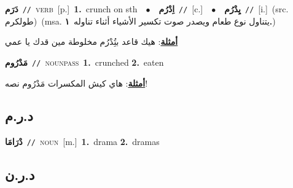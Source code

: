 \documentclass[10pt,a4paper,twoside]{article} %
\begin{document}
\begin{multicols}{2}
{\setlength\topsep{0pt}\textbf{\foreignlanguage{arabic}{دَرَم}}\ {\color{gray}\texttt{//}\color{black}}\ \textsc{verb}\ [p.]\ \textbf{1.}~crunch on sth\ \ $\bullet$\ \ \setlength\topsep{0pt}\textbf{\foreignlanguage{arabic}{اِدْرُم}}\ {\color{gray}\texttt{//}\color{black}}\ [c.]\ \ $\bullet$\ \ \setlength\topsep{0pt}\textbf{\foreignlanguage{arabic}{يِدْرُم}}\ {\color{gray}\texttt{//}\color{black}}\ [i.]\ (src. \color{gray}\foreignlanguage{arabic}{طولكرم}\color{black})\ \color{gray}(msa. \foreignlanguage{arabic}{يتناول نوع طعام ويصدر صوت تكسير الأشياء أثناء تناوله}~\foreignlanguage{arabic}{\textbf{١.}})\color{black}\  \begin{flushright}\color{gray}\foreignlanguage{arabic}{\textbf{\underline{\foreignlanguage{arabic}{أمثلة}}}: هيك قاعد بتُِدْرُم مخلوطة مين قدك يا عمي}\end{flushright}\color{black}} \vspace{2mm}

{\setlength\topsep{0pt}\textbf{\foreignlanguage{arabic}{مَدْرُوم}}\ {\color{gray}\texttt{//}\color{black}}\ \textsc{noun\textunderscore pass}\ \textbf{1.}~crunched  \textbf{2.}~eaten\  \begin{flushright}\color{gray}\foreignlanguage{arabic}{\textbf{\underline{\foreignlanguage{arabic}{أمثلة}}}: هاي كيش المكسرات مَدْرُوم نصه!}\end{flushright}\color{black}} \vspace{2mm}

\vspace{-3mm}
\subsection*{\color{blue}\foreignlanguage{arabic}{د.ر.م}\color{blue}{ (ntws)}} 

{\setlength\topsep{0pt}\textbf{\foreignlanguage{arabic}{دْرَامَا}}\ {\color{gray}\texttt{//}\color{black}}\ \textsc{noun}\ [m.]\ \textbf{1.}~drama  \textbf{2.}~dramas\ } \vspace{2mm}

\vspace{-3mm}
\subsection*{\color{blue}\foreignlanguage{arabic}{د.ر.ن}\color{blue}{}} 


\end{multicols}
\end{document}
